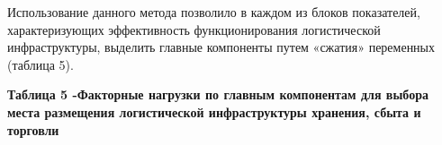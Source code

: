 Использование данного метода позволило в каждом из блоков показателей,
характеризующих эффективность функционирования логистической
инфраструктуры, выделить главные компоненты путем «сжатия» переменных
(таблица 5).

{\bfseries Таблица 5 -Факторные нагрузки по главным компонентам для выбора
места размещения логистической инфраструктуры хранения, сбыта и
торговли}

